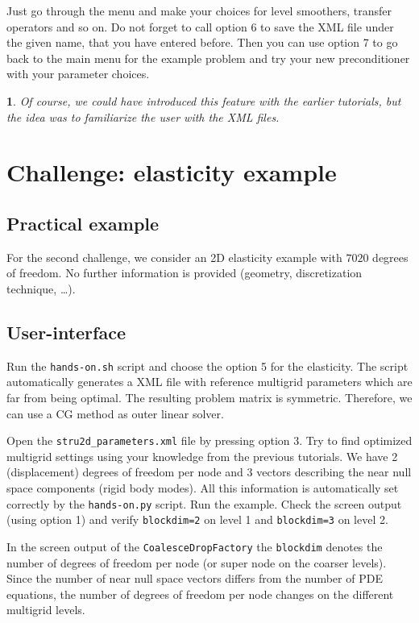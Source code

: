 \documentclass[10pt,fleqn]{book}
\newtheorem*{mycomment}{\ding{42}}
\begin{document}
Just go through the menu and make your choices for level smoothers, transfer operators and so on. Do not forget to call option 6 to save the XML file under the given name, that you have entered before. Then you can use option 7 to go back to the main menu for the example problem and try your new preconditioner with your parameter choices.

\begin{mycomment}
Of course, we could have introduced this feature with the earlier tutorials, but the idea was to familiarize the user with the XML files.
\end{mycomment}

\chapter{Challenge: elasticity example}
\section{Practical example}

For the second challenge, we consider an 2D elasticity example with $7020$ degrees of freedom. No further information is provided (geometry, discretization technique, \ldots).

\section{User-interface}
Run the \verb|hands-on.sh| script and choose the option 5 for the elasticity. The script automatically generates a XML file with reference multigrid parameters which are far from being optimal. The resulting problem matrix is symmetric. Therefore, we can use a CG method as outer linear solver.

\begin{exercise}
Open the \verb|stru2d_parameters.xml| file by pressing option 3. Try to find optimized multigrid settings using your knowledge from the previous tutorials. We have 2 (displacement) degrees of freedom per node and 3 vectors describing the near null space components (rigid body modes). All this information is automatically set correctly by the \verb|hands-on.py| script.
Run the example. Check the screen output (using option 1) and verify \verb|blockdim=2| on level 1 and \verb|blockdim=3| on level 2.
\end{exercise}

In the screen output of the \verb|CoalesceDropFactory| the \verb|blockdim| denotes the number of degrees of freedom per node (or super node on the coarser levels). Since the number of near null space vectors differs from the number of PDE equations, the number of degrees of freedom per node changes on the different multigrid levels.
\end{document}
